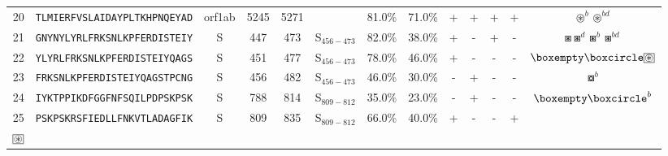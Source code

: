 \begin{tabular}{rcccccccccccc}
20 &  \texttt{TLMIERFVSLAIDAYPLTKHPNQEYAD} &  orf1ab &   5245 &  5271 &                &                          81.0\% &                           71.0\% &          + &           + &          + &           + &                                                                                                       $ \circledast^b \circledast^{bd} $ \\
21 &  \texttt{GNYNYLYRLFRKSNLKPFERDISTEIY} &       S &    447 &   473 &  S$_{456-473}$ &                          82.0\% &                           38.0\% &          + &           - &          + &           - &                                                                                             $ \boxast \boxast^d \boxast^b \boxast^{bd} $ \\
22 &  \texttt{YLYRLFRKSNLKPFERDISTEIYQAGS} &       S &    451 &   477 &  S$_{456-473}$ &                          78.0\% &                           46.0\% &          + &           - &          - &           - &                                                                 $ \boxempty \boxcircle \setlength{\fboxsep}{0.5pt} \boxed{\circledast} $ \\
23 &  \texttt{FRKSNLKPFERDISTEIYQAGSTPCNG} &       S &    456 &   482 &  S$_{456-473}$ &                          46.0\% &                           30.0\% &          - &           + &          - &           - &                                                                                                                         $ \boxcircle^b $ \\
24 &  \texttt{IYKTPPIKDFGGFNFSQILPDPSKPSK} &       S &    788 &   814 &  S$_{809-812}$ &                          35.0\% &                           23.0\% &          - &           + &          - &           - &                                                                                                               $ \boxempty \boxcircle^b $ \\
25 &  \texttt{PSKPSKRSFIEDLLFNKVTLADAGFIK} &       S &    809 &   835 &  S$_{809-812}$ &                          66.0\% &                           40.0\% &          + &           - &          - &           + &                       \Centerstack{  $\boxast \boxast^b \boxcircle \boxcircle^d$ \\  $\setlength{\fboxsep}{0.5pt} \boxed{\circledast}$ } \\
\bottomrule
\end{tabular}

